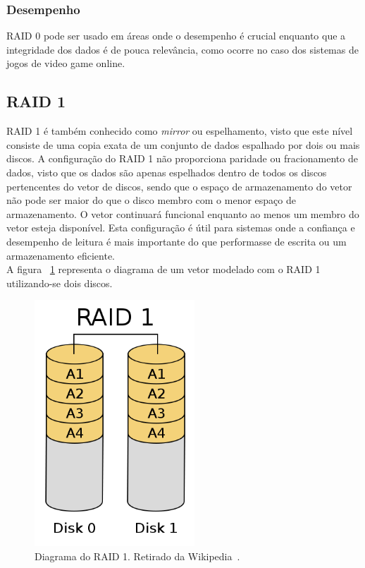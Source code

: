 		\subsubsection{Desempenho}
		
		RAID 0 pode ser usado em áreas onde o desempenho é crucial enquanto que a integridade dos dados é de pouca relevância, como ocorre no caso dos sistemas de jogos de video game online.\\
		
		\subsection{RAID 1}
		
		RAID 1 é também conhecido como \textit{mirror} ou espelhamento, visto que este nível consiste de uma copia exata de um conjunto de dados espalhado por dois ou mais discos. A configuração do RAID 1 não proporciona paridade ou fracionamento de dados, visto que os dados são apenas espelhados dentro de todos os discos pertencentes do vetor de discos, sendo que o espaço de armazenamento do vetor não pode ser maior do que o disco membro com o menor espaço de armazenamento. O vetor continuará funcional enquanto ao menos um membro do vetor esteja disponível. Esta configuração é útil para sistemas onde a confiança e desempenho de leitura é mais importante do que performasse de escrita ou um armazenamento eficiente. \\
		
		A figura ~\ref{fig:raid1} representa o diagrama de um vetor modelado com o RAID 1 utilizando-se dois discos.\\
		
		\begin{figure}[htb]
			\begin{center}
				
				\includegraphics[clip,width=6.0cm]{images/RAID_1.png}
				\caption{Diagrama do RAID 1. Retirado da Wikipedia~\citep{wikiRAIDlevels}.}
				\label{fig:raid1}
			\end{center}
		\end{figure} 
		
